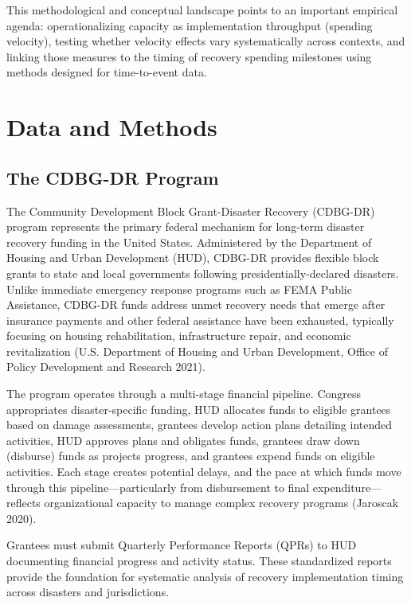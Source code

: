 \documentclass[
  12pt,
  letterpaper,
]{article}
\begin{document}
This methodological and conceptual landscape points to an important
empirical agenda: operationalizing capacity as implementation throughput
(spending velocity), testing whether velocity effects vary
systematically across contexts, and linking those measures to the timing
of recovery spending milestones using methods designed for time-to-event
data.

\section{Data and Methods}\label{data-and-methods}

\subsection{The CDBG-DR Program}\label{the-cdbg-dr-program}

The Community Development Block Grant-Disaster Recovery (CDBG-DR)
program represents the primary federal mechanism for long-term disaster
recovery funding in the United States. Administered by the Department of
Housing and Urban Development (HUD), CDBG-DR provides flexible block
grants to state and local governments following presidentially-declared
disasters. Unlike immediate emergency response programs such as FEMA
Public Assistance, CDBG-DR funds address unmet recovery needs that
emerge after insurance payments and other federal assistance have been
exhausted, typically focusing on housing rehabilitation, infrastructure
repair, and economic revitalization (U.S. Department of Housing and
Urban Development, Office of Policy Development and Research 2021).

The program operates through a multi-stage financial pipeline. Congress
appropriates disaster-specific funding, HUD allocates funds to eligible
grantees based on damage assessments, grantees develop action plans
detailing intended activities, HUD approves plans and obligates funds,
grantees draw down (disburse) funds as projects progress, and grantees
expend funds on eligible activities. Each stage creates potential
delays, and the pace at which funds move through this
pipeline---particularly from disbursement to final
expenditure---reflects organizational capacity to manage complex
recovery programs (Jaroscak 2020).

Grantees must submit Quarterly Performance Reports (QPRs) to HUD
documenting financial progress and activity status. These standardized
reports provide the foundation for systematic analysis of recovery
implementation timing across disasters and jurisdictions.
\end{document}
